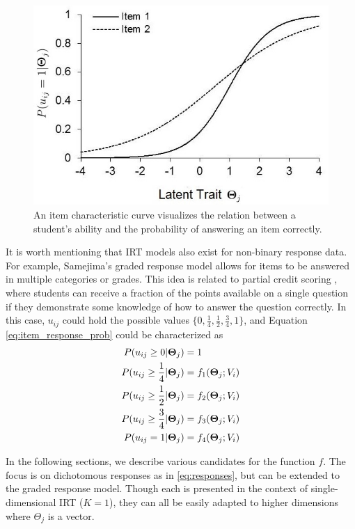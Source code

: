 \begin{figure}[h]
  \centering
  \includegraphics[width=.6\textwidth]{img/logistic_2param_icc.jpg}
  \caption{An item characteristic curve visualizes the relation between a student's ability and the probability of answering an item correctly.}
  \label{fig:icc}
\end{figure}

It is worth mentioning that IRT models also exist for non-binary response data. For example, Samejima's graded response model \cite{samejima1997} allows for items to be answered in multiple categories or grades. This idea is related to partial credit scoring \cite{masters1982}, where students can receive a fraction of the points available on a single question if they demonstrate some knowledge of how to answer the question correctly. In this case, $u_{ij}$ could hold the possible values $\{0, \frac{1}{4}, \frac{1}{2}, \frac{3}{4}, 1\}$, and Equation \ref{eq:item_response_prob} could be characterized as 
\begin{equation}
\begin{split}
  P(u_{ij} \geq 0 | \boldsymbol{\Theta}_j) &= 1 \\
  P(u_{ij} \geq \frac{1}{4} | \boldsymbol{\Theta}_j) &= f_1(\boldsymbol{\Theta}_j;V_i) \\
P(u_{ij} \geq \frac{1}{2} | \boldsymbol{\Theta}_j) &= f_2(\boldsymbol{\Theta}_j;V_i) \\
P(u_{ij} \geq \frac{3}{4} | \boldsymbol{\Theta}_j) &= f_3(\boldsymbol{\Theta}_j;V_i) \\
P(u_{ij} = 1 | \boldsymbol{\Theta}_j) &= f_4(\boldsymbol{\Theta}_j;V_i) 
\end{split}
  \label{eq:graded_response_prob}
\end{equation}

In the following sections, we describe various candidates for the function $f$. The focus is on dichotomous responses as in \ref{eq:responses}, but can be extended to the graded response model. Though each is presented in the context of single-dimensional IRT ($K = 1$), they can all be easily adapted to higher dimensions where $\Theta_j$ is a vector.

